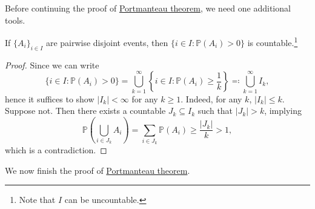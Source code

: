 Before continuing the proof of \hyperref[thm:Portmanteau]{Portmanteau theorem}, we need one additional tools.

\begin{lemma}\label{lma:lec4}
	If \(\{ A_i \} _{i\in I}\) are pairwise disjoint events, then \(\{ i \in I \colon \mathbb{P} (A_i) > 0 \} \) is countable.\footnote{Note that \(I\) can be uncountable.}
\end{lemma}
\begin{proof}
	Since we can write
	\[
		\{ i \in I \colon \mathbb{P} (A_i) >0 \}
		= \bigcup_{k=1}^{\infty} \left\{ i \in I \colon \mathbb{P} (A_i) \geq \frac{1}{k} \right\}
		\eqqcolon \bigcup_{k=1}^{\infty} I_k,
	\]
	hence it suffices to show \(\vert I_k \vert < \infty \) for any \(k \geq 1\). Indeed, for any \(k\), \(\vert I_k \vert \leq k\). Suppose not. Then there exists a countable \(J_k \subseteq I_k\) such that \(\vert J_k \vert > k\), implying
	\[
		\mathbb{P} \left( \bigcup_{i\in J_k} A_i \right)
		= \sum_{i\in J_k} \mathbb{P} (A_i)
		\geq \frac{\vert J_k \vert }{k}
		> 1,
	\]
	which is a contradiction.
\end{proof}

We now finish the proof of \hyperref[thm:Portmanteau]{Portmanteau theorem}.

